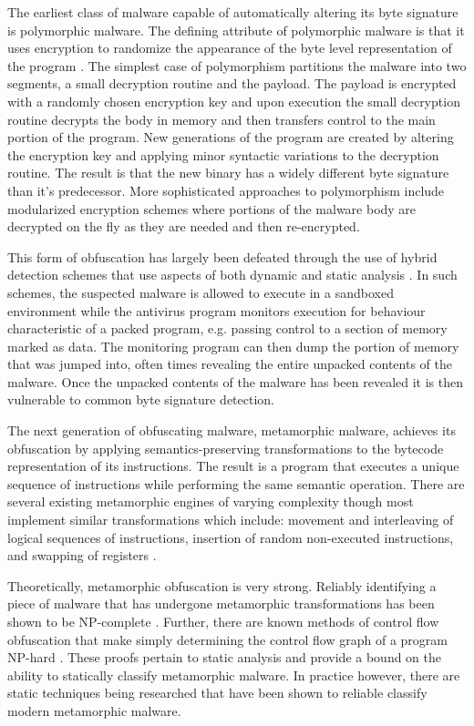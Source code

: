     The earliest class of malware capable of automatically altering its byte
    signature is polymorphic malware. The defining attribute of polymorphic
    malware is that it uses encryption to randomize the appearance of the byte
    level representation of the program \cite{simile}. The simplest case of
    polymorphism partitions the malware into two segments, a small decryption
    routine and the payload. The payload is encrypted with a randomly chosen
    encryption key and upon execution the small decryption routine decrypts the
    body in memory and then transfers control to the main portion of the
    program. New generations of the program are created by altering the
    encryption key and applying minor syntactic variations to the decryption
    routine. The result is that the new binary has a widely different byte
    signature than it's predecessor. More sophisticated approaches to
    polymorphism include modularized encryption schemes where portions of the
    malware body are decrypted on the fly as they are needed and then
    re-encrypted.

    This form of obfuscation has largely been defeated through the use of hybrid
    detection schemes that use aspects of both dynamic and static analysis
    \cite{polyunpack,omniunpack,renovo}. In such schemes, the suspected malware
    is allowed to execute in a sandboxed environment while the antivirus
    program monitors execution for behaviour characteristic of a packed program,
    e.g. passing control to a section of memory marked as data. The monitoring
    program can then dump the portion of memory that was jumped into, often
    times revealing the entire unpacked contents of the malware. Once the
    unpacked contents of the malware has been revealed it is then vulnerable to
    common byte signature
    detection.

    The next generation of obfuscating malware, metamorphic malware, achieves
    its obfuscation by applying semantics-preserving transformations to the
    bytecode representation of its instructions. The result is a program that
    executes a unique sequence of instructions while performing the same
    semantic operation. There are several existing metamorphic engines of
    varying complexity though most implement similar transformations which
    include: movement and interleaving of logical sequences of instructions,
    insertion of random non-executed instructions, and swapping of registers
    \cite{simile}. 

    Theoretically, metamorphic obfuscation is very strong. Reliably identifying
    a piece of malware that has undergone metamorphic transformations has been
    shown to be NP-complete \cite{npcomplete}. Further, there are known methods
    of control flow obfuscation that make simply determining the control flow
    graph of a program NP-hard \cite{controlflow}. These proofs pertain to
    static analysis and provide a bound on the ability to statically classify
    metamorphic malware. In practice however, there are static techniques being
    researched that have been shown to reliable classify modern metamorphic
    malware.

